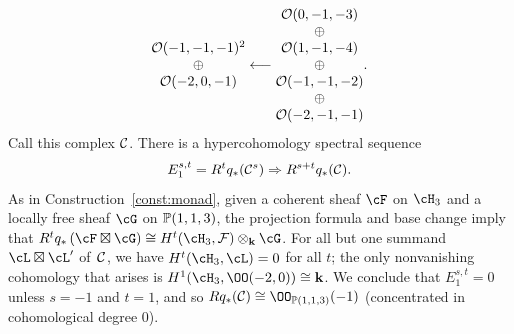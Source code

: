 \documentclass{amsart}
\begin{document}
\begin{example}
\[\begin{matrix}
    {\mathcal O}(-1,-1,-1)^2 \\
    \oplus \\
    {\mathcal O}(-2,0,-1)
\end{matrix}
\longleftarrow
\begin{matrix}
    {\mathcal O}(0,-1,-3)\\
    \oplus \\
    {\mathcal O}(1,-1,-4)\\
    \oplus\\
    {\mathcal O}(-1,-1,-2)\\
    \oplus \\
    {\mathcal O}(-2,-1,-1)
\end{matrix}.
\]
Call this complex $\mathcal{C}$. There is a hypercohomology spectral sequence
\begin{equation}
\label{eqn:hyperss}
E^{s,t}_1 = R^tq_*(\mathcal{C}^s) \Rightarrow R^{s + t}q_*(\mathcal{C}). 
\end{equation}
As in Construction~\ref{const:monad}, given a coherent sheaf $\cF$ on $\cH_3$ and a locally free sheaf $\cG$ on $\mathbb P(1,1,3)$, the projection formula and base change imply that   $R^tq_*\left(\cF\boxtimes \cG\right) \cong H^t(\cH_3, \F) \otimes_\k \cG$. For all but one summand $\cL \boxtimes \cL'$ of~$\mathcal{C}$, we have $H^t(\cH_3, \cL) = 0$ for all $t$; the only nonvanishing cohomology that arises is $H^1(\cH_3, \OO(-2, 0)) \cong \k$. We conclude that $E_1^{s, t} = 0$ unless $s = -1$ and $t = 1$, and so $Rq_*(\cC) \cong \OO_{\PP(1,1,3)}(-1)$ (concentrated in cohomological degree 0). 






\end{example}
\end{document}
